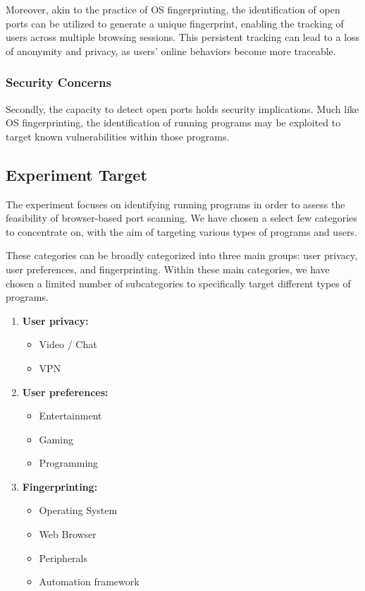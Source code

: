 Moreover, akin to the practice of OS fingerprinting, the identification of open ports can be utilized to generate a unique fingerprint, enabling the tracking of users across multiple browsing sessions. This persistent tracking can lead to a loss of anonymity and privacy, as users' online behaviors become more traceable.

\subsubsection{Security Concerns}

Secondly, the capacity to detect open ports holds security implications. Much like OS fingerprinting, the identification of running programs may be exploited to target known vulnerabilities within those programs. 

\subsection{Experiment Target}

The experiment focuses on identifying running programs in order to assess the feasibility of browser-based port scanning. We have chosen a select few categories to concentrate on, with the aim of targeting various types of programs and users.

These categories can be broadly categorized into three main groups: user privacy, user preferences, and fingerprinting. Within these main categories, we have chosen a limited number of subcategories to specifically target different types of programs.

\begin{enumerate}
    \item \textbf{User privacy:}
    \begin{itemize}
        \item Video / Chat
        \item VPN
    \end{itemize}
    \item \textbf{User preferences:}
    \begin{itemize}
        \item Entertainment
        \item Gaming
        \item Programming
    \end{itemize}
    \item \textbf{Fingerprinting:}
    \begin{itemize}
        \item Operating System
        \item Web Browser
        \item Peripherals
        \item Automation framework
    \end{itemize}
\end{enumerate}

